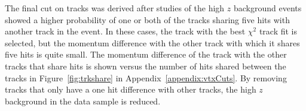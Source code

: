 The final cut on tracks was derived after studies of the high $z$ background events showed a higher probability of one or both of the tracks sharing five hits with another track in the event. In these cases, the track with the best $\chi^2$ track fit is selected, but the momentum difference with the other track with which it shares five hits is quite small. The momentum difference of the track with the other tracks that share hits is shown versus the number of hits shared between the tracks in Figure~\ref{fig:trkshare}  in Appendix~\ref{appendix:vtxCuts}. By removing tracks that only have a one hit difference with other tracks, the high $z$ background in the data sample is reduced.   

